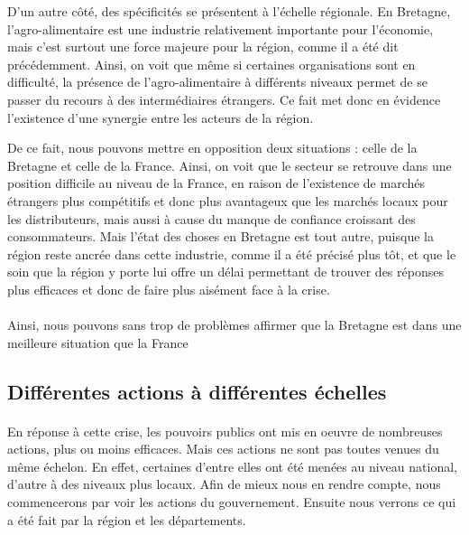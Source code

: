 \documentclass[a4paper,10pt]{report}
\begin{document}
			D’un autre côté, des spécificités se présentent à l’échelle régionale. En Bretagne, l’agro-alimentaire est une industrie relativement importante pour l’économie, mais c’est surtout une force majeure pour la région, comme il a été dit précédemment. Ainsi, on voit que même si certaines organisations sont en difficulté, la présence de l’agro-alimentaire à différents niveaux permet de se passer du recours à des intermédiaires étrangers. Ce fait met donc en évidence l’existence d’une synergie entre les acteurs de la région.

			De ce fait, nous pouvons mettre en opposition deux situations : celle de la Bretagne et celle de la France. Ainsi, on voit que le secteur se retrouve dans une position difficile au niveau de la France, en raison de l’existence de marchés étrangers plus compétitifs et donc plus avantageux que les marchés locaux pour les distributeurs, mais aussi à cause du manque de confiance croissant des consommateurs. Mais l’état des choses en Bretagne est tout autre, puisque la région reste ancrée dans cette industrie, comme il a été précisé plus tôt, et que le soin que la région y porte lui offre un délai permettant de trouver des réponses plus efficaces et donc de faire plus aisément face à la crise.

			\paragraph{}Ainsi, nous pouvons sans trop de problèmes affirmer que la Bretagne est dans une meilleure situation que la France
			
		\subsection{Différentes actions à différentes échelles}
			\paragraph{}En réponse à cette crise, les pouvoirs publics ont mis en oeuvre de nombreuses actions, plus ou moins efficaces. Mais ces actions ne sont pas toutes venues du même échelon. En effet, certaines d'entre elles ont été menées au niveau national, d'autre à des niveaux plus locaux. Afin de mieux nous en rendre compte, nous commencerons par voir les actions du gouvernement. Ensuite nous verrons ce qui a été fait par la région et les départements.
\end{document}
